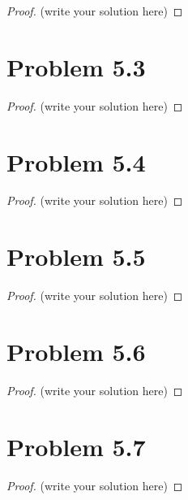 \documentclass[12pt]{article}
\begin{document}
\begin{proof}
	(write your solution here)
\end{proof}

\newpage 

\section{Problem 5.3}

\begin{proof}
	(write your solution here)
\end{proof}

\newpage 

\section{Problem 5.4}

\begin{proof}
	(write your solution here)
\end{proof}

\newpage 

\section{Problem 5.5}

\begin{proof}
	(write your solution here)
\end{proof}

\newpage 

\section{Problem 5.6}

\begin{proof}
	(write your solution here)
\end{proof}

\newpage 

\section{Problem 5.7}

\begin{proof}
	(write your solution here)
\end{proof}
\end{document}
